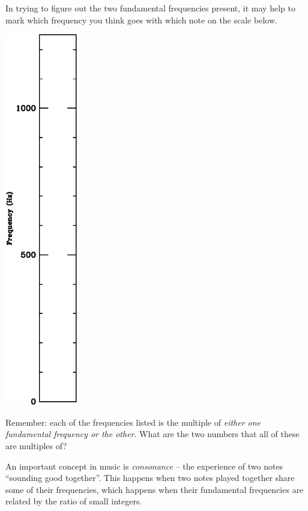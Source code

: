\documentclass[12pt]{article}
\begin{document}
In trying to figure out the two fundamental frequencies present, it may help to mark which frequency you think goes with which note on the scale below.
\begin{center}
\includegraphics[width=1.25in]{scale.pdf}
\end{center}

Remember: each of the frequencies listed is the multiple of {\it either one fundamental frequency or the other}. What are the two numbers that all of these are multiples of?

\newpage

An important concept in music is {\it consonance} -- the experience of two notes ``sounding good together''. This happens when two notes played together share some of their frequencies, which happens when their fundamental frequencies are related by the ratio of small integers. 
\end{document}

